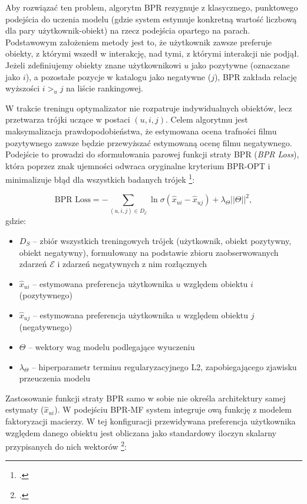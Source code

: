 Aby rozwiązać ten problem, algorytm BPR rezygnuje z klasycznego, punktowego podejścia do uczenia modelu (gdzie system estymuje konkretną wartość liczbową dla pary użytkownik-obiekt) na rzecz podejścia opartego na parach. Podstawowym założeniem metody jest to, że użytkownik zawsze preferuje obiekty, z którymi wszedł w interakcję, nad tymi, z którymi interakcji nie podjął. Jeżeli zdefiniujemy obiekty znane użytkownikowi $u$ jako pozytywne (oznaczane jako $i$), a pozostałe pozycje w katalogu jako negatywne ($j$), BPR zakłada relację wyższości $i >_u j$ na liście rankingowej.

W trakcie treningu optymalizator nie rozpatruje indywidualnych obiektów, lecz przetwarza trójki uczące w postaci $(u, i, j)$. Celem algorytmu jest maksymalizacja prawdopodobieństwa, że estymowana ocena trafności filmu pozytywnego zawsze będzie przewyższać estymowaną ocenę filmu negatywnego. Podejście to prowadzi do sformułowania parowej funkcji straty BPR (\textit{BPR Loss}), która poprzez znak ujemności odwraca oryginalne kryterium BPR-OPT i minimalizuje błąd dla wszystkich badanych trójek \footcite{rendleBPRBayesianPersonalized2009}:

\begin{equation}
    \text{BPR Loss} = -\sum_{(u,i,j) \in D_{\mathcal{E}}} \ln \sigma(\hat{x}_{ui} - \hat{x}_{uj}) + \lambda_\Theta ||\Theta||^2
    \label{eq:bpr_opt},
\end{equation}
gdzie:
\begin{itemize}
    \item $D_S$ -- zbiór wszystkich treningowych trójek (użytkownik, obiekt pozytywny, obiekt negatywny), formułowany na podstawie zbioru zaobserwowanych zdarzeń $\mathcal{E}$ i zdarzeń negatywnych z nim rozłącznych
    \item $\hat{x}_{ui}$ -- estymowana preferencja użytkownika $u$ względem obiektu $i$ (pozytywnego)
    \item $\hat{x}_{uj}$ -- estymowana preferencja użytkownika $u$ względem obiektu $j$ (negatywnego)
    \item $\Theta$ -- wektory wag modelu podlegające wyuczeniu
    \item $\lambda_\Theta$ -- hiperparametr terminu regularyzacyjnego L2, zapobiegającego zjawisku przeuczenia modelu
\end{itemize}

Zastosowanie funkcji straty BPR samo w sobie nie określa architektury samej estymaty ($\hat{x}_{ui}$). W podejściu BPR-MF system integruje ową funkcję z modelem faktoryzacji macierzy. W tej konfiguracji przewidywana preferencja użytkownika względem danego obiektu jest obliczana jako standardowy iloczyn skalarny przypisanych do nich wektorów \footcite{rendleBPRBayesianPersonalized2009}:

